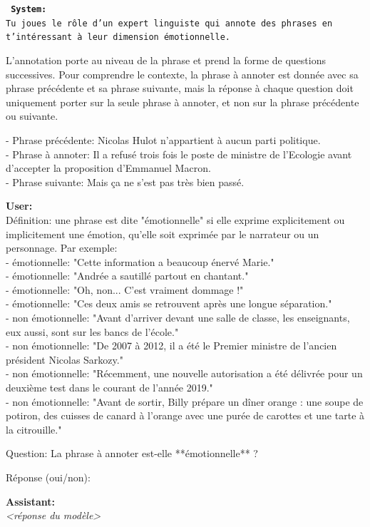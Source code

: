{\tt\scriptsize
\textbf{System:}\\
Tu joues le rôle d'un expert linguiste qui annote des phrases en t'intéressant à leur dimension émotionnelle.

L'annotation porte au niveau de la phrase et prend la forme de questions successives. Pour comprendre le contexte, la phrase à annoter est donnée avec sa phrase précédente et sa phrase suivante, mais la réponse à chaque question doit uniquement porter sur la seule phrase à annoter, et non sur la phrase précédente ou suivante.

- Phrase précédente: Nicolas Hulot n’appartient à aucun parti politique.\\
- Phrase à annoter: Il a refusé trois fois le poste de ministre de l’Ecologie avant d’accepter la proposition d’Emmanuel Macron.\\
- Phrase suivante: Mais ça ne s’est pas très bien passé.

\textbf{User:}\\
Définition: une phrase est dite "émotionnelle" si elle exprime explicitement ou implicitement une émotion, qu'elle soit exprimée par le narrateur ou un personnage. Par exemple:\\
- émotionnelle: "Cette information a beaucoup énervé Marie."\\
- émotionnelle: "Andrée a sautillé partout en chantant."\\
- émotionnelle: "Oh, non... C'est vraiment dommage !"\\
- émotionnelle: "Ces deux amis se retrouvent après une longue séparation."\\
- non émotionnelle: "Avant d'arriver devant une salle de classe, les enseignants, eux aussi, sont sur les bancs de l'école."\\
- non émotionnelle: "De 2007 à 2012, il a été le Premier ministre de l'ancien président Nicolas Sarkozy."\\
- non émotionnelle: "Récemment, une nouvelle autorisation a été délivrée pour un deuxième test dans le courant de l'année 2019."\\
- non émotionnelle: "Avant de sortir, Billy prépare un dîner orange : une soupe de potiron, des cuisses de canard à l'orange avec une purée de carottes et une tarte à la citrouille."

Question: La phrase à annoter est-elle **émotionnelle** ?

Réponse (oui/non):

\textbf{Assistant:}\\
\textit{<réponse du modèle>}

}
